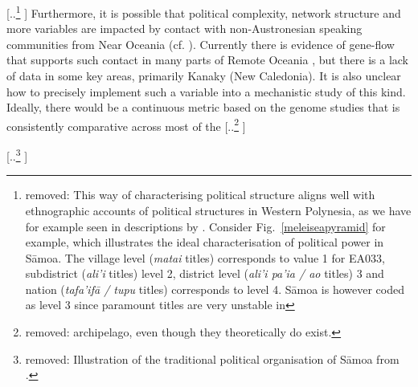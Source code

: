 \documentclass[unnumsec,webpdf,modern,medium]{oup-authoring-template}
\providecommand{\DIFaddtex}[1]{{\protect\color{blue} \sf #1}} %
\providecommand{\DIFdeltex}[1]{{\protect\color{red} [..\footnote{removed: #1} ]}} %
\providecommand{\DIFaddbegin}{} %
\providecommand{\DIFaddend}{} %
\providecommand{\DIFdelbegin}{} %
\providecommand{\DIFdelend}{} %
\providecommand{\DIFdelFL}[1]{\DIFdel{#1}} %
\providecommand{\DIFadd}[1]{\texorpdfstring{\DIFaddtex{#1}}{#1}} %
\providecommand{\DIFdel}[1]{\texorpdfstring{\DIFdeltex{#1}}{}} %
\newcommand{\DIFscaledelfig}{0.5}
\newlength{\DIFdelgraphicswidth} %
\newlength{\DIFdelgraphicsheight} %
\newcommand{\DIFaddincludegraphics}[2][]{{\color{blue}\fbox{\DIFOincludegraphics[#1]{#2}}}} %
\newcommand{\DIFdelincludegraphics}[2][]{%
\sbox{\DIFdelgraphicsbox}{\DIFOincludegraphics[#1]{#2}}%
\settoboxwidth{\DIFdelgraphicswidth}{\DIFdelgraphicsbox} %
\settoboxtotalheight{\DIFdelgraphicsheight}{\DIFdelgraphicsbox} %
\scalebox{\DIFscaledelfig}{%
\parbox[b]{\DIFdelgraphicswidth}{\usebox{\DIFdelgraphicsbox}\\[-\baselineskip] \rule{\DIFdelgraphicswidth}{0em}}\llap{\resizebox{\DIFdelgraphicswidth}{\DIFdelgraphicsheight}{%
\setlength{\unitlength}{\DIFdelgraphicswidth}%
\begin{picture}(1,1)%
\thicklines\linethickness{2pt} %
{\color[rgb]{1,0,0}\put(0,0){\framebox(1,1){}}}%
{\color[rgb]{1,0,0}\put(0,0){\line( 1,1){1}}}%
{\color[rgb]{1,0,0}\put(0,1){\line(1,-1){1}}}%
\end{picture}%
}\hspace*{3pt}}} %
} %
\DeclareRobustCommand{\DIFaddbegin}{\DIFOaddbegin \let\includegraphics\DIFaddincludegraphics} %
\DeclareRobustCommand{\DIFaddend}{\DIFOaddend \let\includegraphics\DIFOincludegraphics} %
\DeclareRobustCommand{\DIFdelbegin}{\DIFOdelbegin \let\includegraphics\DIFdelincludegraphics} %
\DeclareRobustCommand{\DIFdelend}{\DIFOaddend \let\includegraphics\DIFOincludegraphics} %
\begin{document}
\DIFdel{This way of characterising political structure aligns well with ethnographic accounts of political structures in Western Polynesia, as we have for example seen in descriptions by \citet{sahlins63}. Consider Fig.~\ref{meleiseapyramid} \citep[22]{meleisea1995} for example, which illustrates the ideal characterisation of political power in S\={a}moa. The village level (\emph{matai} titles) corresponds to value 1 for EA033, subdistrict (\emph{ali'i} titles) level 2, district level (\emph{ali'i pa'ia / ao} titles) 3 and nation (\emph{tafa'if\={a} / tupu} titles) corresponds to level 4. S\={a}moa is however coded as level 3 since paramount titles are very unstable in }\DIFdelend \DIFaddbegin \DIFadd{Furthermore, it is possible that political complexity, network structure and more variables are impacted by contact with non-Austronesian speaking communities from Near Oceania (cf. \citet{lynch1981melanesian}). Currently there is evidence of gene-flow that supports such contact in many parts of Remote Oceania \citep{posth_jena_ancient_dna_vanuatu_2018, lipson_harvad_ancient_dna_vanuatu_2018, liu2022ancient}, but there is a lack of data in some key areas, primarily Kanaky (New Caledonia). It is also unclear how to precisely implement such a variable into a mechanistic study of this kind. Ideally, there would be a continuous metric based on the genome studies that is consistently comparative across most of }\DIFaddend the \DIFdelbegin \DIFdel{archipelago, even though they theoretically do exist. }%


{%
\DIFdelFL{Illustration of the traditional political organisation of S\={a}moa from \citet[22]{meleisea1995}.}%
}
\end{document}
